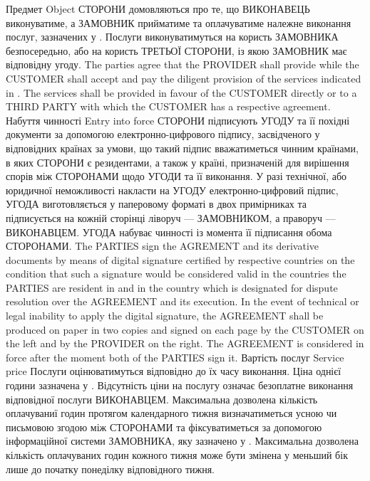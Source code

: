 \begin{Form}
\begin{paracol}{3}
        {}
      \clause
        {Предмет}
        {Object}
        {}
        {СТОРОНИ домовляються про те, що ВИКОНАВЕЦЬ виконуватиме, а ЗАМОВНИК прийматиме та оплачуватиме належне виконання послуг, зазначених у . Послуги виконуватимуться на користь ЗАМОВНИКА безпосередьно, або на користь ТРЕТЬОЇ СТОРОНИ, із якою ЗАМОВНИК має відповідну угоду.}
        {The parties agree that the PROVIDER shall provide while the CUSTOMER shall accept and pay the diligent provision of the services indicated in . The services shall be provided in favour of the CUSTOMER directly or to a THIRD PARTY with which the CUSTOMER has a respective agreement.}
        {}
      \clause
        {Набуття чинності}
        {Entry into force}
        {}
        {СТОРОНИ підписують УГОДУ та її похідні документи за допомогою електронно-цифрового підпису, засвідченого у відповідних країнах за умови, що такий підпис вважатиметься чинним країнами, в яких СТОРОНИ є резидентами, а також у країні, призначеній для вирішення спорів між СТОРОНАМИ щодо УГОДИ та її виконання. У разі технічної, або юридичної неможливості накласти на УГОДУ електронно-цифровий підпис, УГОДА виготовляється у паперовому форматі в двох примірниках та підписується на кожній сторінці ліворуч — ЗАМОВНИКОМ, а праворуч — ВИКОНАВЦЕМ. УГОДА набуває чинності із момента її підписання обома СТОРОНАМИ.}
        {The PARTIES sign the AGREMENT and its derivative documents by means of digital signature certified by respective countries on the condition that such a signature would be considered valid in the countries the PARTIES are resident in and in the country which is designated for dispute resolution over the AGREEMENT and its execution. In the event of technical or legal inability to apply the digital signature, the AGREEMENT shall be produced on paper in two copies and signed on each page by the CUSTOMER on the left and by the PROVIDER on the right. The AGREEMENT is considered in force after the moment both of the PARTIES sign it.}
        {}
      \clause
        {Вартість послуг}
        {Service price}
        {}
        {Послуги оцінюватимуться відповідно до їх часу виконання. Ціна однієї години зазначена у . Відсутність ціни на послугу означає безоплатне виконання відповідної послуги ВИКОНАВЦЕМ. Максимальна дозволена кількість оплачуваниї годин протягом календарного тижня визначатиметься усною чи письмовою згодою між СТОРОНАМИ та фіксуватиметься за допомогою інформаційної системи ЗАМОВНИКА, яку зазначено у . Максимальна дозволена кількість оплачуваних годин кожного тижня може бути змінена у меньший бік лише до початку понеділку відповідного тижня.}

\end{paracol}
\end{Form}

